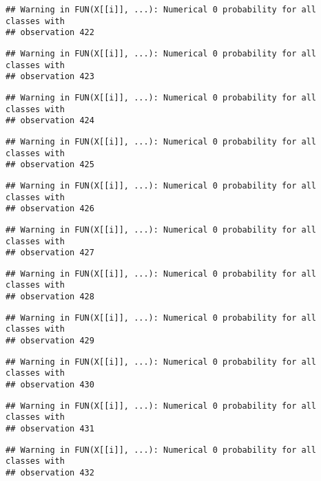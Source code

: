 \documentclass[
]{article}
\begin{document}
\begin{verbatim}
## Warning in FUN(X[[i]], ...): Numerical 0 probability for all classes with
## observation 422
\end{verbatim}

\begin{verbatim}
## Warning in FUN(X[[i]], ...): Numerical 0 probability for all classes with
## observation 423
\end{verbatim}

\begin{verbatim}
## Warning in FUN(X[[i]], ...): Numerical 0 probability for all classes with
## observation 424
\end{verbatim}

\begin{verbatim}
## Warning in FUN(X[[i]], ...): Numerical 0 probability for all classes with
## observation 425
\end{verbatim}

\begin{verbatim}
## Warning in FUN(X[[i]], ...): Numerical 0 probability for all classes with
## observation 426
\end{verbatim}

\begin{verbatim}
## Warning in FUN(X[[i]], ...): Numerical 0 probability for all classes with
## observation 427
\end{verbatim}

\begin{verbatim}
## Warning in FUN(X[[i]], ...): Numerical 0 probability for all classes with
## observation 428
\end{verbatim}

\begin{verbatim}
## Warning in FUN(X[[i]], ...): Numerical 0 probability for all classes with
## observation 429
\end{verbatim}

\begin{verbatim}
## Warning in FUN(X[[i]], ...): Numerical 0 probability for all classes with
## observation 430
\end{verbatim}

\begin{verbatim}
## Warning in FUN(X[[i]], ...): Numerical 0 probability for all classes with
## observation 431
\end{verbatim}

\begin{verbatim}
## Warning in FUN(X[[i]], ...): Numerical 0 probability for all classes with
## observation 432
\end{verbatim}
\end{document}
